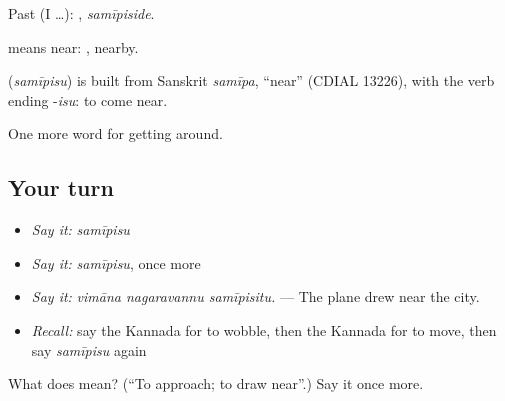 Past (I …): , \emph{samīpiside}.

 means near: , nearby.

\begin{cousinweb}
\textbf{} (\emph{samīpisu}) is built from Sanskrit \emph{samīpa}, \textquotedblleft{}near\textquotedblright{} (CDIAL 13226), with the verb ending -\emph{isu}: to come near.
\end{cousinweb}

\begin{grammarlens}[title={What you've built}]
One more word for getting around.
\end{grammarlens}

\subsection*{Your turn}
\begin{itemize}
\raggedright
  \item \emph{Say it:} \emph{samīpisu}
  \item \emph{Say it:} \emph{samīpisu}, once more
  \item \emph{Say it:} \emph{vimāna nagaravannu samīpisitu.} — The plane drew near the city.
  \item \emph{Recall:} say the Kannada for to wobble, then the Kannada for to move, then say \emph{samīpisu} again
\end{itemize}

\begin{tcolorbox}[breakable,colback=teal!4,colframe=teal!35!black,title={Before you move on}]
What does  mean? (\textquotedblleft{}To approach; to draw near\textquotedblright{}.) Say it once more.
\end{tcolorbox}
